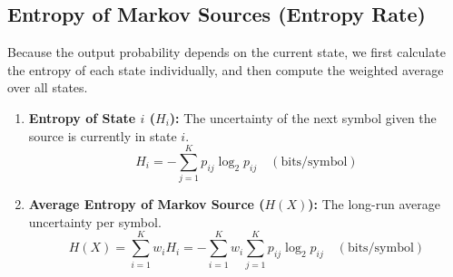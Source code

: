 \documentclass[12pt,a4paper]{article}
\begin{document}
\subsection{Entropy of Markov Sources (Entropy Rate)}
Because the output probability depends on the current state, we first calculate the entropy of each state individually, and then compute the weighted average over all states.
\begin{tcolorbox}[formulabox, title={\textbf{Markov Source Entropy Rate Formulas}}]
\begin{enumerate}[label=\textbf{\arabic*.}, leftmargin=1.5em, itemsep=4pt, topsep=2pt]
  \item \textbf{Entropy of State $i$ ($H_i$):} The uncertainty of the next symbol given the source is currently in state $i$.
    \begin{equation}
      H_i = -\sum_{j=1}^K p_{ij} \log_2 p_{ij} \quad (\text{bits/symbol})
    \end{equation}
  \item \textbf{Average Entropy of Markov Source ($H(X)$):} The long-run average uncertainty per symbol.
    \begin{equation}
      H(X) = \sum_{i=1}^K w_i H_i = -\sum_{i=1}^K w_i \sum_{j=1}^K p_{ij} \log_2 p_{ij} \quad (\text{bits/symbol})
    \end{equation}
\end{enumerate}
\end{tcolorbox}
\end{document}
